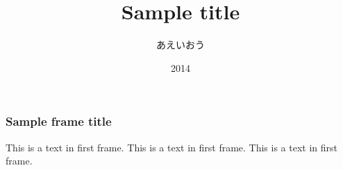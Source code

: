 \documentclass{beamer}
\title{Sample title}
\author{あえいおう}
\institute{ShareLaTeX}
\date{2014}
\begin{document}
 
\frame{\titlepage}
 
\begin{frame}
\frametitle{Sample frame title}
This is a text in first frame. This is a text in first frame. This is a text in first frame.
\end{frame}
 
\end{document}
